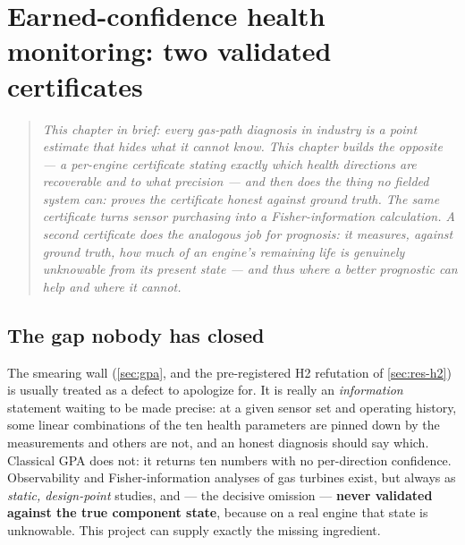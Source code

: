 \chapter{Earned-confidence health monitoring: two validated certificates}
\label{ch:breakthrough}

\begin{quote}\itshape
This chapter in brief: every gas-path diagnosis in industry is a point estimate that hides
what it cannot know. This chapter builds the opposite --- a per-engine certificate stating
exactly which health directions are recoverable and to what precision --- and then does the
thing no fielded system can: \emph{proves the certificate honest against ground truth}. The
same certificate turns sensor purchasing into a Fisher-information calculation. A second
certificate does the analogous job for prognosis: it measures, against ground truth, how much
of an engine's remaining life is genuinely unknowable from its present state --- and thus
where a better prognostic can help and where it cannot.
\end{quote}



\section{The gap nobody has closed}
\label{sec:bt-gap}

The smearing wall (\cref{sec:gpa}, and the pre-registered H2 refutation of \cref{sec:res-h2})
is usually treated as a defect to apologize for. It is really an \emph{information} statement
waiting to be made precise: at a given sensor set and operating history, some linear
combinations of the ten health parameters are pinned down by the measurements and others are
not, and an honest diagnosis should say which. Classical GPA does not: it returns ten
numbers with no per-direction confidence. Observability and Fisher-information analyses of
gas turbines exist, but always as \emph{static, design-point} studies, and --- the decisive
omission --- \textbf{never validated against the true component state}, because on a real
engine that state is unknowable. This project can supply exactly the missing ingredient.

